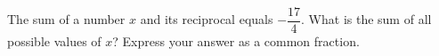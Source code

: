 The sum of a number $x$ and its reciprocal equals $-\dfrac{17}{4}$. What is the sum of all possible values of $x$? Express your answer as a common fraction. 
